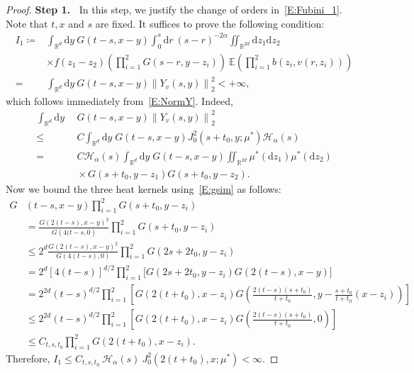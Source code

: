 \documentclass[sn-mathphys]{sn-jnl}%
\newcommand{\BR}{\mathbb{R}}
\newcommand{\E}{\mathbb{E}}
\newcommand{\Norm}[1]{\left\| #1 \right\|}
\newcommand{\ud}{\ensuremath{\mathrm{d}}}
\numberwithin{equation}{section}
\theoremstyle{thmstyleone}%
\theoremstyle{thmstyletwo}%
\theoremstyle{thmstylethree}%
\begin{document}
\begin{proof}
  \textbf{\noindent Step 1.~} In this step, we justify the change of orders in~\eqref{E:Fubini_1}.
  Note that $t, x$ and $s$ are fixed. It suffices to prove the following condition:
  \begin{align*}
    I_1\coloneqq & \int_{\BR^d}\ud y \: G(t-s,x-y) \int_0^s \ud r\: (s-r)^{-2\alpha} \iint_{\BR^{2d}} \ud z_1\ud z_2\:                \\
                 & \times f(z_1-z_2) \left(\prod_{i = 1}^{2} G(s-r,y-z_i)\right) \: \E\left(\prod_{i = 1}^{2}b(z_i,v(r,z_i))\right) \\
       =         & \int_{\BR^d}\ud y \: G(t-s,x-y) \Norm{Y_v(s,y)}_2^2 < +\infty,
  \end{align*}
  which follows immediately from~\eqref{E:NormY}. Indeed,
  \begin{align*}
    \int_{\BR^d}\ud y \: &\: G(t-s,x-y) \Norm{Y_v(s,y)}_2^2                                                                       \\
    \le                 &\: C \int_{\BR^d} \ud y \; G(t-s,x-y) J_0^2 (s+t_0,y;\mu^*) \mathcal{H}_\alpha(s)                        \\
    =                   &\: C \mathcal{H}_\alpha(s) \int_{\BR^d} \ud y \; G(t-s,x-y)\iint_{\BR^{2d}}\mu^* (\ud z_1)\mu^* (\ud z_2) \\
                        &\: \times G\left(s+t_0,y-z_1\right)G\left(s+t_0,y-z_2\right).
  \end{align*}
  Now we bound the three heat kernels using~\eqref{E:gsim} as follows:
  \begin{align*}
    G & (t-s,x-y) \prod_{i = 1}^{2}G(s+t_0,y- z_i)                                                                                                              \\
      & = \frac{G\left(2(t-s),x-y\right)^2}{G\left(4(t-s,0\right)} \prod_{i = 1}^{2}G\left(s+t_0,y- z_i\right)                                                  \\
      & \le 2^d \frac{G\left(2(t-s),x-y\right)^2}{G\left(4(t-s),0\right)} \prod_{i = 1}^{2}G\left(2s+2t_0,y- z_i\right)                                         \\
      & = 2^d [4(t-s)]^{d/2} \prod_{i = 1}^{2}\bigg[ G\left(2s+2t_0,y- z_i\right)G\left(2(t-s),x-y\right)\bigg]                                                 \\
      & = 2^{2d} (t-s)^{d/2} \prod_{i = 1}^{2}\left[G\left(2(t+t_0),x- z_i\right)G\left(\frac{2(t-s)(s+t_0)}{t+t_0},y-\frac{s+t_0}{t+t_0}(x- z_i)\right)\right] \\
      & \le 2^{2d} (t-s)^{d/2} \prod_{i = 1}^{2}\left[G\left(2(t+t_0),x- z_i\right)G\left(\frac{2(t-s)(s+t_0)}{t+t_0},0\right)\right]                           \\
      & \le C_{t,s,t_0} \prod_{i = 1}^{2} G\left(2(t+t_0),x- z_i\right).
  \end{align*}
  Therefore, $I_1\le C_{t,s,t_0} \: \mathcal{H}_{\alpha}(s) \: J_0^2\left(2(t+t_0),x;\mu^*\right)
  <\infty$. \bigskip


\end{proof}
\end{document}
